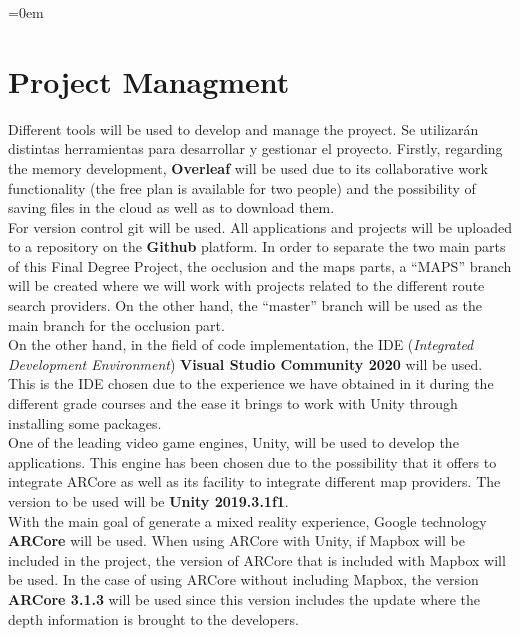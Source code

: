 \parindent=0em
\section{Project Managment}
\noindent

Different tools will be used to develop and manage the proyect. 
Se utilizarán distintas herramientas para desarrollar y gestionar el proyecto. Firstly, regarding the memory development, \textbf{Overleaf} will be used due to its collaborative work functionality (the free plan is available for two people) and the possibility of saving files in the cloud as well as to download them.\\

For version control git will be used. All applications and projects will be uploaded to a repository on the \textbf{Github} platform. In order to separate the two main parts of this Final Degree Project, the occlusion and the maps parts, a ``MAPS'' branch will be created where we will work with projects related to the different route search providers. On the other hand, the ``master'' branch will be used as the main branch for the occlusion part.\\

On the other hand, in the field of code implementation, the IDE (\textit{Integrated Development Environment}) \textbf{Visual Studio Community 2020} will be used. This is the IDE chosen due to the experience we have obtained in it during the different grade courses and the ease it brings to work with Unity through installing some packages.\\

One of the leading video game engines, Unity, will be used to develop the applications. This engine has been chosen due to the possibility that it offers to integrate ARCore as well as its facility to integrate different map providers. The version to be used will be \textbf {Unity 2019.3.1f1}.\\


With the main goal of generate a mixed reality experience, Google technology \textbf {ARCore} will be used. When using ARCore with Unity, if Mapbox will be included in the project, the version of ARCore that is included with Mapbox will be used. In the case of using ARCore without including Mapbox, the version \textbf {ARCore 3.1.3} will be used since this version includes the update where the depth information is brought to the developers.
